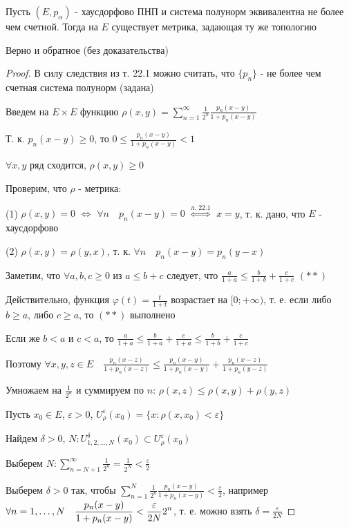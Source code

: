\documentclass[a4paper,12pt]{report}
\newcommand*{\hm}[1]{#1\nobreak\discretionary{}%
            {\hbox{$\mathsurround=0pt #1$}}{}}
\begin{document}
\begin{thm}
Пусть $(E,p_\alpha)$ - хаусдорфово ПНП и система полунорм эквивалентна не более чем счетной. Тогда на $E$ существует метрика, задающая ту же топологию
\end{thm}
\begin{rem}
Верно и обратное (без доказательства)
\end{rem}
\begin{proof}
В силу следствия из т. 22.1 можно считать, что $\{p_n\}$ - не более чем счетная система полунорм (задана)

Введем на $E\times E$ функцию $\rho(x,y)=\sum\limits_{n=1}^\infty\displaystyle\frac1{2^n}\displaystyle\frac{p_n(x-y)}{1+p_n(x-y)}$

Т. к. $p_n(x-y)\ge0$, то $0\le\displaystyle\frac{p_n(x-y)}{1+p_n(x-y)}<1$

$\forall x,y$ ряд сходится, $\rho(x,y)\ge0$

Проверим, что $\rho$ - метрика:

(1) $\rho(x,y)=0$ $\Leftrightarrow$ $\forall n\quad p_n(x-y)=0$ $\stackrel{\text{л. 22.1}}{\Longleftrightarrow}$ $x=y$, т. к. дано, что $E$ - хаусдорфово

(2) $\rho(x,y)=\rho(y,x)$, т. к. $\forall n\quad p_n(x-y)=p_n(y-x)$

Заметим, что $\forall a,b,c\ge0$ из $a\le b+c$ следует, что $\frac{a}{1+a}\le\frac{b}{1+b}+\frac{c}{1+c}$ $(**)$

Действительно, функция $\varphi(t)=\frac{t}{1+t}$ возрастает на $[0;+\infty)$, т. е. если либо $b\ge a$, либо $c\ge a$, то $(**)$ выполнено

Если же $b<a$ и $c<a$, то $\frac{a}{1+a}\le\frac{b}{1+a}+\frac{c}{1+a}\le\frac{b}{1+b}+\frac{c}{1+c}$

Поэтому $\forall x,y,z\in E\quad\displaystyle\frac{p_n(x-z)}{1+p_n(x-z)}\le\displaystyle\frac{p_n(x-y)}{1+p_n(x-y)}+\displaystyle\frac{p_n(x-z)}{1+p_n(y-z)}$

Умножаем на $\displaystyle\frac1{2^n}$ и суммируем по $n$: $\rho(x,z)\le\rho(x,y)+\rho(y,z)$

Пусть $x_0\in E$, $\varepsilon>0$, $U_\rho^\varepsilon(x_0)=\{x\colon\rho(x,x_0)<\varepsilon\}$

Найдем $\delta>0$, $N\colon U_{1,2,\ldots,N}^\delta(x_0)\subset U_\rho^\varepsilon(x_0)$

Выберем $N\colon\sum\limits_{n=N+1}^\infty\displaystyle\frac1{2^n}=\displaystyle\frac1{2^N}<\displaystyle\frac\varepsilon2$

Выберем $\delta>0$ так, чтобы $\sum\limits_{n=1}^N\displaystyle\frac1{2^n}\displaystyle\frac{p_n(x-y)}{1+p_n(x-y)}<\displaystyle\frac\varepsilon2$, например $\forall n\hm=1,\ldots,N\quad\displaystyle\frac{p_n(x-y)}{1+p_n(x-y)}<\displaystyle\frac{\varepsilon}{2N}2^n$, т. е. можно взять $\delta=\displaystyle\frac{\varepsilon}{2N}$


\end{proof}
\end{document}
